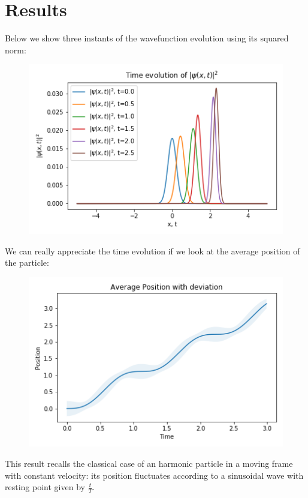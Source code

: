 \documentclass{article}
\begin{document}
\section*{Results}
Below we show three instants of the wavefunction evolution using its squared norm:
\begin{center}
	\begin{figure}[h!]
		\includegraphics[height=0.5\linewidth]{sqwave.png}
	\end{figure}
\end{center}
We can really appreciate the time evolution if we look at the average position of the particle:
\begin{center}
	\begin{figure}[h!]
		\includegraphics[height=0.5\linewidth]{avgdev.png}
	\end{figure}
\end{center}
This result recalls the classical case of an harmonic particle in a moving frame with constant velocity: its position fluctuates according to a sinusoidal wave with resting point given by $\frac{t}{T}$.
\end{document}
